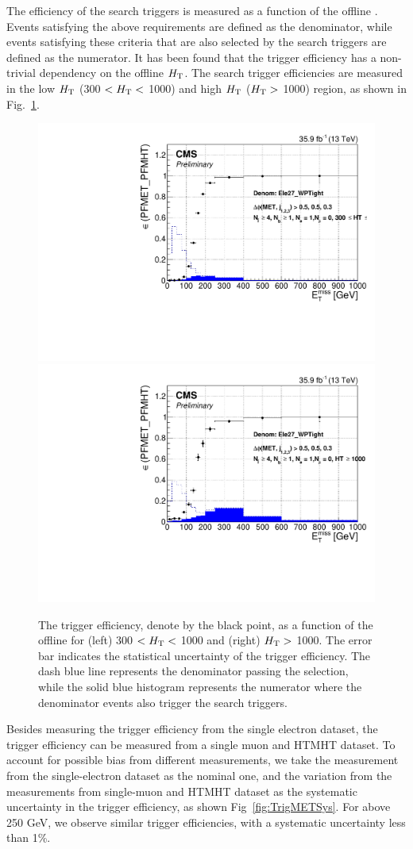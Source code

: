 The efficiency of the search triggers is measured as a function of the offline \MET. Events satisfying the above requirements are defined as the
denominator, while events satisfying these criteria that are also selected by the search triggers are defined as the numerator. It has been found that the \MET trigger efficiency has a non-trivial dependency on the offline $H_{\mathrm{T}}$. The search trigger efficiencies are measured in the low $H_{\mathrm{T}}$ (300 $< H_{\mathrm{T}} <$ 1000) and high
$H_{\mathrm{T}}$ ($H_{\mathrm{T}} >$ 1000) region, as shown in Fig.~\ref{fig:TrigMET}.
\begin{figure}[tbp]
 \begin{center}
   \includegraphics[width=0.49\linewidth]{sections/mc4/EvtSelSBOpt/figures/TrigEle_Stop_TrigMET_HTLess1000_9.pdf}
   \includegraphics[width=0.49\linewidth]{sections/mc4/EvtSelSBOpt/figures/TrigEle_Stop_TrigMET_HTMore1000_9.pdf}
   \caption{ The trigger efficiency, denote by the black point, as a function
   of the offline \MET for (left) 300 $< H_{\mathrm{T}} <$ 1000 and (right) $H_{\mathrm{T}} >$ 1000.
   The error bar indicates the statistical uncertainty of the trigger
   efficiency. The dash blue line represents the denominator passing the
   selection, while the solid blue histogram represents the numerator where
   the denominator events also trigger the search triggers. }
   \label{fig:TrigMET}
 \end{center}
\end{figure}

Besides measuring the \MET trigger efficiency from the single electron dataset, the trigger efficiency can be measured from a single muon and HTMHT dataset. To account for possible bias from different measurements, we take the measurement from the single-electron dataset as the nominal one, and the variation from the measurements from single-muon and HTMHT dataset as the systematic uncertainty in the trigger efficiency, as shown Fig~\ref{fig:TrigMETSys}. For \MET above 250 GeV, we observe similar \MET trigger efficiencies, with a systematic uncertainty less than 1\%.

